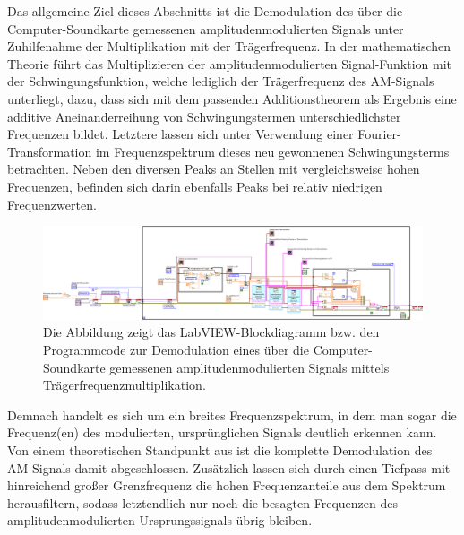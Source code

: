 \documentclass[
a4paper,
12pt,
pagesize,
ngerman
]{scrartcl}
\begin{document}
	Das allgemeine Ziel dieses Abschnitts ist die Demodulation des über die Computer-Soundkarte gemessenen amplitudenmodulierten Signals unter Zuhilfenahme der Multiplikation mit der Trägerfrequenz. In der mathematischen Theorie führt das Multiplizieren der amplitudenmodulierten Signal-Funktion mit der Schwingungsfunktion, welche lediglich der Trägerfrequenz des AM-Signals unterliegt, dazu, dass sich mit dem passenden Additionstheorem als Ergebnis eine additive Aneinanderreihung von Schwingungstermen unterschiedlichster Frequenzen bildet. Letztere lassen sich unter Verwendung einer Fourier-Transformation im Frequenzspektrum dieses neu gewonnenen Schwingungsterms betrachten. Neben den diversen Peaks an Stellen mit vergleichsweise hohen Frequenzen, befinden sich darin ebenfalls Peaks bei relativ niedrigen Frequenzwerten.
		
	\begin{figure}[H]
		\centering
		\includegraphics[width=1.0\textwidth]{EIRE2018Dateien/Tag4/traegerMultOszi/Oszilloskop__modifiziertd}
		\caption{Die Abbildung zeigt das LabVIEW-Blockdiagramm bzw. den Programmcode zur Demodulation eines über die Computer-Soundkarte gemessenen amplitudenmodulierten Signals mittels Trägerfrequenzmultiplikation.}
		\label{MultiTraegerProgrammcode}
	\end{figure}

	\noindent Demnach handelt es sich um ein breites Frequenzspektrum, in dem man sogar die Frequenz(en) des modulierten, ursprünglichen Signals deutlich erkennen kann. Von einem theoretischen Standpunkt aus ist die komplette Demodulation des AM-Signals damit abgeschlossen. Zusätzlich lassen sich durch einen Tiefpass mit hinreichend großer Grenzfrequenz die hohen Frequenzanteile aus dem Spektrum herausfiltern, sodass letztendlich nur noch die besagten Frequenzen des amplitudenmodulierten Ursprungssignals übrig bleiben. 
	
\end{document}
